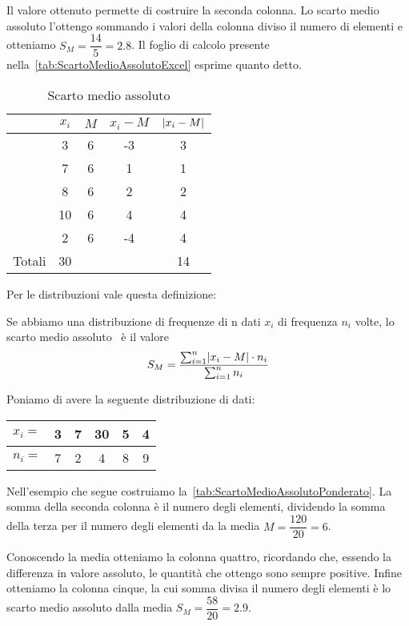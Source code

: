 Il valore ottenuto permette di costruire la seconda colonna. Lo scarto medio assoluto  l'ottengo sommando i valori della colonna diviso il numero di elementi e otteniamo  $S_{M}=\dfrac{14}{5}=\num{2.8}$. Il foglio di calcolo presente nella~\vref{tab:ScartoMedioAssolutoExcel} esprime quanto detto.
\begin{table}
	\centering
	\begin{tabular}{l*{4} {S[table-format=2.0]}}
		\toprule
	&{$x_{i}$}&{$M$}&{$x_{i}-M$}	& {$\abs{x_{i}-M} $} \\
	\midrule 
		&3&6&-3&3\\ 
		&7&6&1&1  \\ 
		&8&6&2& 2 \\ 
		&10&6&4&4  \\ 
		&2&6&-4& 4 \\ 
		\midrule
		{Totali}&30&&&14  \\
		\bottomrule 
	\end{tabular} 
	\caption{Scarto medio assoluto}
	\label{tab:ScartoMedioAssoluto}
\end{table}
Per le distribuzioni vale questa definizione:
\begin{defn}
	Se abbiamo una distribuzione di frequenze di n dati  $x_{i}$ di frequenza $n_{i}$ volte,  lo scarto medio assoluto~ è  il valore \[ S_{M}=\dfrac{\sum_{i=1}^{n}\abs{x_{i}-M}\cdot n_{i} }{  \sum_{i=1}^{n} n_{i}}\]
\end{defn}
Poniamo di avere la seguente distribuzione di dati:
\begin{center}
	\begin{tabular}{l*{2} {S[table-format=1.0]}S[table-format=2.0]*{2} {S[table-format=1.0]}}
		{$x_{i}=$}	&3  &7  &30  &5  &4 \\
		\midrule 
		{$n_{i}=$}	& 7 &2  & 4 & 8 & 9\\   
	\end{tabular}
\end{center}
Nell'esempio che segue costruiamo la~\vref{tab:ScartoMedioAssolutoPonderato}.  La somma della seconda colonna è il numero degli elementi, dividendo la somma della terza per il numero degli elementi da la media $M=\dfrac{\num{120}}{\num{20}}=\num{6}$. 

Conoscendo la media otteniamo la colonna quattro, ricordando che, essendo la differenza in valore assoluto, le quantità che ottengo sono sempre positive. Infine otteniamo la colonna cinque, la cui somma divisa il numero degli elementi è lo scarto medio assoluto dalla media $S_{M}=\dfrac{\num{58}}{\num{20}}=\num{2.9}$. 


